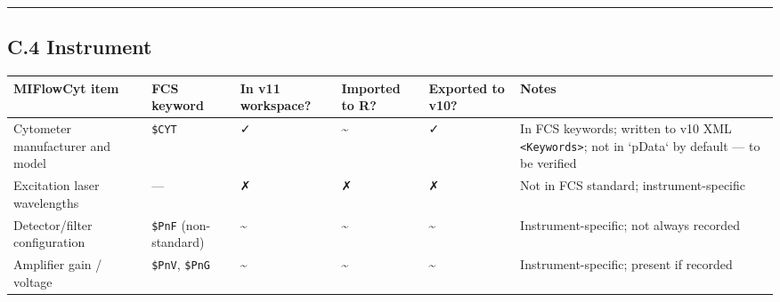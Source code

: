 \documentclass[
]{article}
\begin{document}
\begin{center}\rule{0.5\linewidth}{0.5pt}\end{center}

\subsection{C.4 Instrument}\label{c.4-instrument}

\begin{longtable}[]{@{}
  >{\raggedright\arraybackslash}p{}
  >{\raggedright\arraybackslash}p{}
  >{\raggedright\arraybackslash}p{}
  >{\raggedright\arraybackslash}p{}
  >{\raggedright\arraybackslash}p{}
  >{\raggedright\arraybackslash}p{}@{}}
\toprule\noalign{}
\begin{minipage}[b]{\linewidth}\raggedright
MIFlowCyt item
\end{minipage} & \begin{minipage}[b]{\linewidth}\raggedright
FCS keyword
\end{minipage} & \begin{minipage}[b]{\linewidth}\raggedright
In v11 workspace?
\end{minipage} & \begin{minipage}[b]{\linewidth}\raggedright
Imported to R?
\end{minipage} & \begin{minipage}[b]{\linewidth}\raggedright
Exported to v10?
\end{minipage} & \begin{minipage}[b]{\linewidth}\raggedright
Notes
\end{minipage} \\
\midrule\noalign{}
\endhead
\bottomrule\noalign{}
\endlastfoot
Cytometer manufacturer and model & \texttt{\$CYT} & ✓ &
\textasciitilde{} & ✓ & In FCS keywords; written to v10 XML
\texttt{\textless{}Keywords\textgreater{}};
\textcolor{pending}{not in `pData` by default — to be verified} \\
Excitation laser wavelengths & --- & ✗ & ✗ & ✗ & Not in FCS standard;
instrument-specific \\
Detector/filter configuration & \texttt{\$PnF} (non-standard) &
\textasciitilde{} & \textasciitilde{} & \textasciitilde{} &
Instrument-specific; not always recorded \\
Amplifier gain / voltage & \texttt{\$PnV}, \texttt{\$PnG} &
\textasciitilde{} & \textasciitilde{} & \textasciitilde{} &
Instrument-specific; present if recorded \\
\end{longtable}
\end{document}

